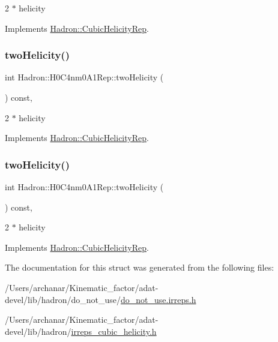 2 $\ast$ helicity 

Implements \mbox{\hyperlink{structHadron_1_1CubicHelicityRep_af507aa56fc2747eacc8cb6c96db31ecc}{Hadron\+::\+Cubic\+Helicity\+Rep}}.

\mbox{\label{structHadron_1_1H0C4nm0A1Rep_a24164f53b9067951c0c9fa30be36ca8b}} 
\subsubsection{\texorpdfstring{twoHelicity()}{twoHelicity()}\hspace{0.1cm}{\footnotesize\ttfamily [2/3]}}
{\footnotesize\ttfamily int Hadron\+::\+H0\+C4nm0\+A1\+Rep\+::two\+Helicity (\begin{DoxyParamCaption}{ }\end{DoxyParamCaption}) const\hspace{0.3cm}{\ttfamily [inline]}, {\ttfamily [virtual]}}

2 $\ast$ helicity 

Implements \mbox{\hyperlink{structHadron_1_1CubicHelicityRep_af507aa56fc2747eacc8cb6c96db31ecc}{Hadron\+::\+Cubic\+Helicity\+Rep}}.

\mbox{\label{structHadron_1_1H0C4nm0A1Rep_a24164f53b9067951c0c9fa30be36ca8b}} 
\subsubsection{\texorpdfstring{twoHelicity()}{twoHelicity()}\hspace{0.1cm}{\footnotesize\ttfamily [3/3]}}
{\footnotesize\ttfamily int Hadron\+::\+H0\+C4nm0\+A1\+Rep\+::two\+Helicity (\begin{DoxyParamCaption}{ }\end{DoxyParamCaption}) const\hspace{0.3cm}{\ttfamily [inline]}, {\ttfamily [virtual]}}

2 $\ast$ helicity 

Implements \mbox{\hyperlink{structHadron_1_1CubicHelicityRep_af507aa56fc2747eacc8cb6c96db31ecc}{Hadron\+::\+Cubic\+Helicity\+Rep}}.



The documentation for this struct was generated from the following files\+:\begin{DoxyCompactItemize}
\item 
/\+Users/archanar/\+Kinematic\+\_\+factor/adat-\/devel/lib/hadron/do\+\_\+not\+\_\+use/\mbox{\hyperlink{adat-devel_2lib_2hadron_2do__not__use_2do__not__use_8irreps_8h}{do\+\_\+not\+\_\+use.\+irreps.\+h}}\item 
/\+Users/archanar/\+Kinematic\+\_\+factor/adat-\/devel/lib/hadron/\mbox{\hyperlink{adat-devel_2lib_2hadron_2irreps__cubic__helicity_8h}{irreps\+\_\+cubic\+\_\+helicity.\+h}}\end{DoxyCompactItemize}
